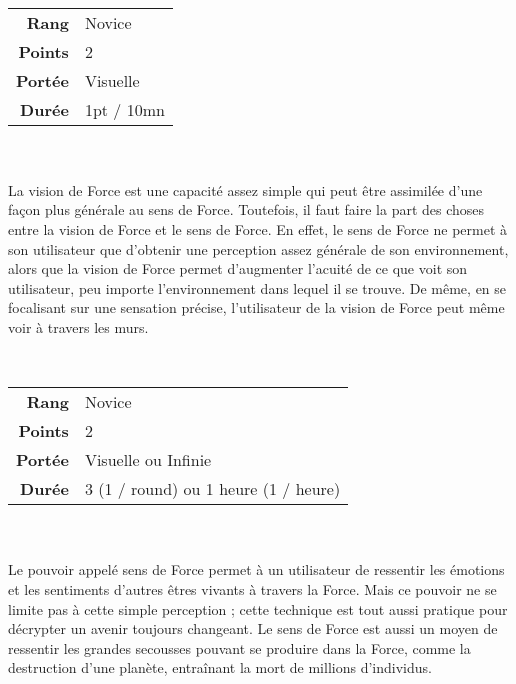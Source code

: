 \begin{description}[align=left] 
    \item [Vision de Force] ~ \\

        \begin{tabular}{ r l }
            \textbf{Rang}    & Novice \\
            \textbf{Points}  & 2 \\
            \textbf{Portée}  & Visuelle \\
            \textbf{Durée}   & 1pt / 10mn \\
        \end{tabular}
        \\ \\
        La vision de Force est une capacité assez simple qui peut être assimilée d’une façon plus générale au sens de Force. Toutefois, il faut faire la part des choses entre la vision de Force et le sens de Force. En effet, le sens de Force ne permet à son utilisateur que d’obtenir une perception assez générale de son environnement, alors que la vision de Force permet d’augmenter l’acuité de ce que voit son utilisateur, peu importe l’environnement dans lequel il se trouve. De même, en se focalisant sur une sensation précise, l’utilisateur de la vision de Force peut même voir à travers les murs.
        \\

    \item [Sens de Force] ~ \\

        \begin{tabular}{ r l }
            \textbf{Rang}    & Novice \\
            \textbf{Points}  & 2 \\
            \textbf{Portée}  & Visuelle ou Infinie \\
            \textbf{Durée}   & 3 (1 / round) ou 1 heure (1 / heure) \\
        \end{tabular}
        \\ \\
        Le pouvoir appelé sens de Force permet à un utilisateur de ressentir les émotions et les sentiments d’autres êtres vivants à travers la Force. Mais ce pouvoir ne se limite pas à cette simple perception ; cette technique est tout aussi pratique pour décrypter un avenir toujours changeant. Le sens de Force est aussi un moyen de ressentir les grandes secousses pouvant se produire dans la Force, comme la destruction d’une planète, entraînant la mort de millions d’individus. 


\end{description}
